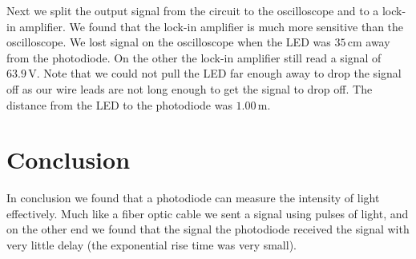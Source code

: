 \documentclass[11pt]{article}
\numberwithin{equation}{section}
\numberwithin{figure}{section}
\numberwithin{table}{section}
\newcommand{\unit}[1]{\ensuremath{\, \mathrm{#1}}}
\begin{document}
Next we split the output signal from the circuit to the oscilloscope and to a lock-in amplifier. We found that the lock-in amplifier is much more sensitive than the oscilloscope. We lost signal on the oscilloscope when the LED was $35\unit{cm}$ away from the photodiode. On the other the lock-in amplifier still read a signal of $63.9\unit{V}$. Note that we could not pull the LED far enough away to drop the signal off as our wire leads are not long enough to get the signal to drop off. The distance from the LED to the photodiode was $1.00\unit{m}$.

\section{Conclusion}
In conclusion we found that a photodiode can measure the intensity of light effectively. Much like a fiber optic cable we sent a signal using pulses of light, and on the other end we found that the signal the photodiode received the signal with very little delay (the exponential rise time was very small).
\end{document}
